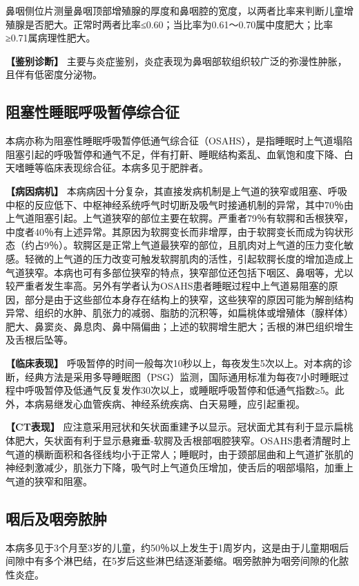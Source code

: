 鼻咽侧位片测量鼻咽顶部增殖腺的厚度和鼻咽腔的宽度，以两者比率来判断儿童增殖腺是否肥大。正常时两者比率≤0.60；当比率为0.61～0.70属中度肥大；比率≥0.71属病理性肥大。

\textbf{【鉴别诊断】}
主要与炎症鉴别，炎症表现为鼻咽部软组织较广泛的弥漫性肿胀，且伴有低密度分泌物。

\subsection{阻塞性睡眠呼吸暂停综合征}

本病亦称为阻塞性睡眠呼吸暂停低通气综合征（OSAHS），是指睡眠时上气道塌陷阻塞引起的呼吸暂停和通气不足，伴有打鼾、睡眠结构紊乱、血氧饱和度下降、白天嗜睡等临床表现综合征。本病多见于肥胖者。

\textbf{【病因病机】}
本病病因十分复杂，其直接发病机制是上气道的狭窄或阻塞、呼吸中枢的反应低下、中枢神经系统呼气时切断及吸气时接通机制的异常，其中70％由上气道阻塞引起。上气道狭窄的部位主要在软腭。严重者79％有软腭和舌根狭窄，中度者40％有上述异常。其原因为软腭变长而非增厚，由于软腭变长而成为钩状形态（约占9％）。软腭区是正常上气道最狭窄的部位，且肌肉对上气道的压力变化敏感。轻微的上气道的压力改变可触发软腭肌肉的活性，引起软腭长度的增加造成上气道狭窄。本病也可有多部位狭窄的特点，狭窄部位还包括下咽区、鼻咽等，尤以较严重者发生率高。另外有学者认为OSAHS患者睡眠过程中上气道易阻塞的原因，部分是由于这些部位本身存在结构上的狭窄，这些狭窄的原因可能为解剖结构异常、组织的水肿、肌张力的减弱、脂肪的沉积等，如扁桃体或增殖体（腺样体）肥大、鼻窦炎、鼻息肉、鼻中隔偏曲；上述的软腭增生肥大；舌根的淋巴组织增生及舌根后坠等。

\textbf{【临床表现】}
呼吸暂停的时间一般每次10秒以上，每夜发生5次以上。对本病的诊断，经典方法是采用多导睡眠图（PSG）监测，国际通用标准为每夜7小时睡眠过程中呼吸暂停及低通气反复发作30次以上，或睡眠呼吸暂停和低通气指数≥5。此外，本病易继发心血管疾病、神经系统疾病、白天易睡，应引起重视。

\textbf{【CT表现】}
应注意采用冠状和矢状面重建予以显示。冠状面尤其有利于显示扁桃体肥大，矢状面有利于显示悬雍垂-软腭及舌根部咽腔狭窄。OSAHS患者清醒时上气道的横断面积和各径线均小于正常人；睡眠时，由于颈部屈曲和上气道扩张肌的神经刺激减少，肌张力下降，吸气时上气道负压增加，使舌后的咽部塌陷，加重上气道的狭窄和阻塞。

\subsection{咽后及咽旁脓肿}

本病多见于3个月至3岁的儿童，约50％以上发生于1周岁内，这是由于儿童期咽后间隙中有多个淋巴结，在5岁后这些淋巴结逐渐萎缩。咽旁脓肿为咽旁间隙的化脓性炎症。

